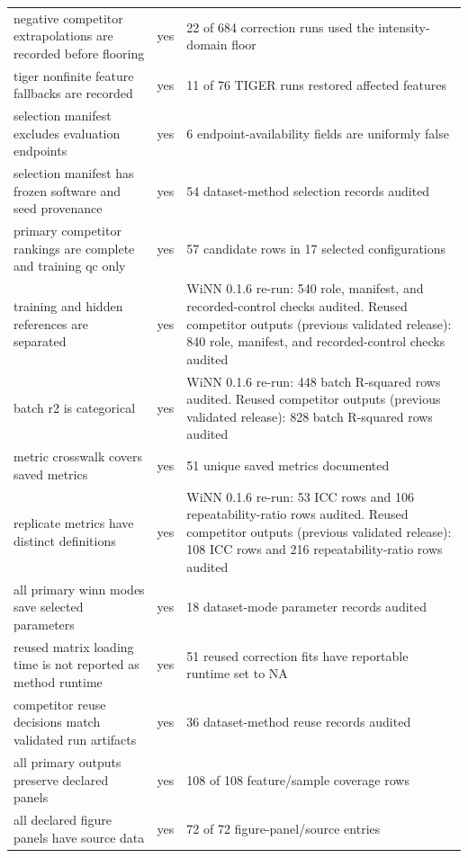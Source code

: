 \begin{longtable}{llp{10.5cm}}
negative competitor extrapolations are recorded before flooring & yes & 22 of 684 correction runs used the intensity-domain floor \\
tiger nonfinite feature fallbacks are recorded & yes & 11 of 76 TIGER runs restored affected features \\
selection manifest excludes evaluation endpoints & yes & 6 endpoint-availability fields are uniformly false \\
selection manifest has frozen software and seed provenance & yes & 54 dataset-method selection records audited \\
primary competitor rankings are complete and training qc only & yes & 57 candidate rows in 17 selected configurations \\
training and hidden references are separated & yes & WiNN 0.1.6 re-run: 540 role, manifest, and recorded-control checks audited. Reused competitor outputs (previous validated release): 840 role, manifest, and recorded-control checks audited \\
batch r2 is categorical & yes & WiNN 0.1.6 re-run: 448 batch R-squared rows audited. Reused competitor outputs (previous validated release): 828 batch R-squared rows audited \\
metric crosswalk covers saved metrics & yes & 51 unique saved metrics documented \\
replicate metrics have distinct definitions & yes & WiNN 0.1.6 re-run: 53 ICC rows and 106 repeatability-ratio rows audited. Reused competitor outputs (previous validated release): 108 ICC rows and 216 repeatability-ratio rows audited \\
all primary winn modes save selected parameters & yes & 18 dataset-mode parameter records audited \\
reused matrix loading time is not reported as method runtime & yes & 51 reused correction fits have reportable runtime set to NA \\
competitor reuse decisions match validated run artifacts & yes & 36 dataset-method reuse records audited \\
all primary outputs preserve declared panels & yes & 108 of 108 feature/sample coverage rows \\
all declared figure panels have source data & yes & 72 of 72 figure-panel/source entries \\
\end{longtable}
